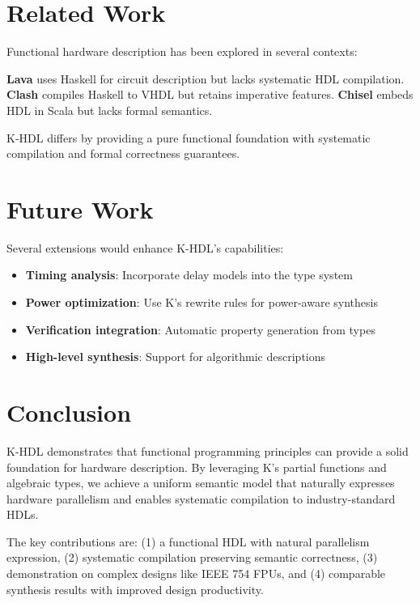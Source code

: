 \documentclass[10pt,twocolumn]{article}
\begin{document}
\section{Related Work}

Functional hardware description has been explored in several contexts:

\textbf{Lava} \cite{bjesse1998lava} uses Haskell for circuit description but lacks systematic HDL compilation. \textbf{Clash} \cite{baaij2010clash} compiles Haskell to VHDL but retains imperative features. \textbf{Chisel} \cite{bachrach2012chisel} embeds HDL in Scala but lacks formal semantics.

K-HDL differs by providing a pure functional foundation with systematic compilation and formal correctness guarantees.

\section{Future Work}

Several extensions would enhance K-HDL's capabilities:

\begin{itemize}
\item \textbf{Timing analysis}: Incorporate delay models into the type system
\item \textbf{Power optimization}: Use K's rewrite rules for power-aware synthesis
\item \textbf{Verification integration}: Automatic property generation from types
\item \textbf{High-level synthesis}: Support for algorithmic descriptions
\end{itemize}

\section{Conclusion}

K-HDL demonstrates that functional programming principles can provide a solid foundation for hardware description. By leveraging K's partial functions and algebraic types, we achieve a uniform semantic model that naturally expresses hardware parallelism and enables systematic compilation to industry-standard HDLs.

The key contributions are: (1) a functional HDL with natural parallelism expression, (2) systematic compilation preserving semantic correctness, (3) demonstration on complex designs like IEEE 754 FPUs, and (4) comparable synthesis results with improved design productivity.
\end{document}
